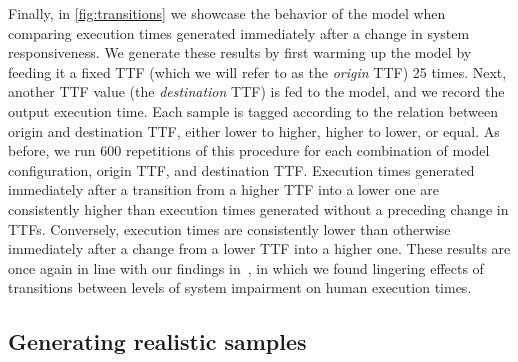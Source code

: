 Finally, in \cref{fig:transitions} we showcase the behavior of the model when comparing execution times generated immediately after a change in system responsiveness.
We generate these results by first warming up the model by feeding it a fixed \ac{TTF} (which we will refer to as the \emph{origin} \ac{TTF}) \num{25} times.
Next, another \ac{TTF} value (the \emph{destination} \ac{TTF}) is fed to the model, and we record the output execution time.
Each sample is tagged according to the relation between origin and destination \ac{TTF}, either lower to higher, higher to lower, or equal.
As before, we run \num{600} repetitions of this procedure for each combination of model configuration, origin \ac{TTF}, and destination \ac{TTF}.
Execution times generated immediately after a transition from a higher \ac{TTF} into a lower one are consistently higher than execution times generated without a preceding change in \acp{TTF}.
Conversely, execution times are consistently lower than otherwise immediately after a change from a lower \ac{TTF} into a higher one.
These results are once again in line with our findings in~\cite{olguinmunoz2021impact}, in which we found lingering effects of transitions between levels of system impairment on human execution times.


\subsection{Generating realistic samples}\label{ssec:model:frames}

